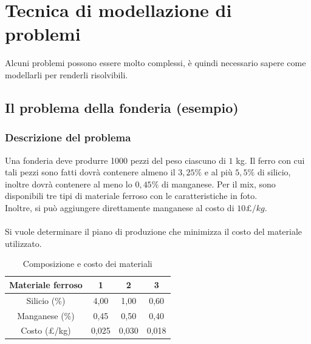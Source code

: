\documentclass[12pt,a4paper]{article}
\let\oldsection\section
\renewcommand{\section}{\clearpage\oldsection}
\begin{document}
\section{Tecnica di modellazione di problemi}
Alcuni problemi possono essere molto complessi, è quindi necessario sapere come modellarli per renderli risolvibili.
\subsection{Il problema della fonderia (esempio)}
\subsubsection{Descrizione del problema}
Una fonderia deve produrre 1000 pezzi del peso ciascuno di $1$ kg. Il ferro con cui tali pezzi sono fatti dovrà contenere almeno il $3,25\%$ e al più $5,5\%$ di silicio, inoltre dovrà contenere al meno lo $0,45\%$ di manganese. Per il mix, sono disponibili tre tipi di materiale ferroso con le caratteristiche in foto.\\
Inoltre, si può aggiungere direttamente manganese al costo di $10£/kg$.\\\\
Si vuole determinare il piano di produzione che minimizza il costo del materiale utilizzato.
\begin{table}[h]
    \centering
    \begin{tabular}{cccc}
        \hline
        Materiale ferroso & 1 & 2 & 3 \\
        \hline
        Silicio (\%)    & 4,00  & 1,00  & 0,60  \\
        Manganese (\%)  & 0,45  & 0,50  & 0,40  \\
        Costo (£/kg)    & 0,025 & 0,030 & 0,018 \\
        \hline
    \end{tabular}
    \caption{Composizione e costo dei materiali}
    \label{tab:composizione_costo}
\end{table}
\end{document}
